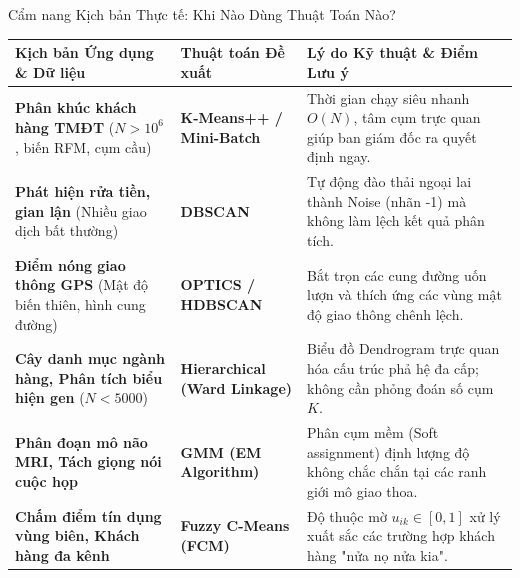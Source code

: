 \documentclass[aspectratio=169,10pt]{beamer}
\begin{document}
\begin{frame}{Cẩm nang Kịch bản Thực tế: Khi Nào Dùng Thuật Toán Nào?}
  \begin{table}[]
    \tiny
    \centering
    \begin{tabularx}{\textwidth}{p{3.2cm} p{2.4cm} X}
      \toprule
      \textbf{Kịch bản Ứng dụng \& Dữ liệu} & \textbf{Thuật toán Đề xuất} & \textbf{Lý do Kỹ thuật \& Điểm Lưu ý} \\
      \midrule
      \textbf{Phân khúc khách hàng TMĐT} ($N > 10^6$, biến RFM, cụm cầu) & \textbf{K-Means++ / Mini-Batch} & Thời gian chạy siêu nhanh $O(N)$, tâm cụm trực quan giúp ban giám đốc ra quyết định ngay. \\
      \addlinespace
      \textbf{Phát hiện rửa tiền, gian lận} (Nhiều giao dịch bất thường) & \textbf{DBSCAN} & Tự động đào thải ngoại lai thành Noise (nhãn -1) mà không làm lệch kết quả phân tích. \\
      \addlinespace
      \textbf{Điểm nóng giao thông GPS} (Mật độ biến thiên, hình cung đường) & \textbf{OPTICS / HDBSCAN} & Bắt trọn các cung đường uốn lượn và thích ứng các vùng mật độ giao thông chênh lệch. \\
      \addlinespace
      \textbf{Cây danh mục ngành hàng, Phân tích biểu hiện gen} ($N < 5000$) & \textbf{Hierarchical (Ward Linkage)} & Biểu đồ Dendrogram trực quan hóa cấu trúc phả hệ đa cấp; không cần phỏng đoán số cụm $K$. \\
      \addlinespace
      \textbf{Phân đoạn mô não MRI, Tách giọng nói cuộc họp} & \textbf{GMM (EM Algorithm)} & Phân cụm mềm (Soft assignment) định lượng độ không chắc chắn tại các ranh giới mô giao thoa. \\
      \addlinespace
      \textbf{Chấm điểm tín dụng vùng biên, Khách hàng đa kênh} & \textbf{Fuzzy C-Means (FCM)} & Độ thuộc mờ $u_{ik} \in [0,1]$ xử lý xuất sắc các trường hợp khách hàng "nửa nọ nửa kia". \\
      \bottomrule
    \end{tabularx}
  \end{table}
\end{frame}
\end{document}
